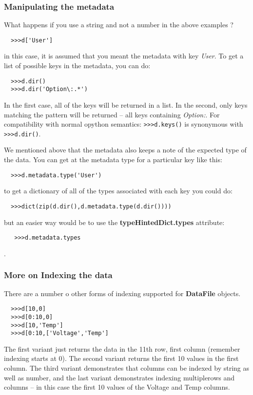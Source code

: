 \documentclass[a4paper,11pt]{scrartcl}
\begin{document}
\subsubsection{Manipulating the metadata}

What happens if you use a string and not a number in the above examples ?
\begin{verbatim}
  >>>d['User']
\end{verbatim}
in this case, it is assumed that you meant the metadata with key \textit{User}.
To get a list of possible keys in the metadata, you can do:
\begin{verbatim}
  >>>d.dir()
  >>>d.dir('Option\:.*')
\end{verbatim}
In the first case, all of the keys will be returned in a list. In the second,
only keys matching the pattern will be returned -- all keys containing
\textit{Option:}. For compatibility with normal opython semantics: \verb#>>>d.keys()# is
synonymous with \verb#>>>d.dir()#.

We mentioned above that the metadata also keeps a note of the expected type of
the data. You can get at the metadata type for a particular key like this:
\begin{verbatim}
  >>>d.metadata.type('User')
\end{verbatim}
to get a dictionary of all of the types associated with each key you could do:
\begin{verbatim}
  >>>dict(zip(d.dir(),d.metadata.type(d.dir())))
\end{verbatim}
but an easier way would be to use the \textbf{typeHintedDict.types} attribute:
\begin{verbatim}
   >>>d.metadata.types
\end{verbatim}
.

\subsubsection{More on Indexing the data}

There are a number o other forms of indexing supported for \textbf{DataFile}
objects.

\begin{verbatim}
  >>>d[10,0]
  >>>d[0:10,0]
  >>>d[10,'Temp']
  >>>d[0:10,['Voltage','Temp']
\end{verbatim}

The first variant just returns the data in the 11th row, first column (remember
indexing starts at 0). The second variant returns the first 10 values in the
first column. The third variant demonstrates that columns can be indexed by
string as well as number, and the last variant demonstrates indexing
multiplerows and columns -- in this case the first 10 values of the Voltage and
Temp columns.
\end{document}
